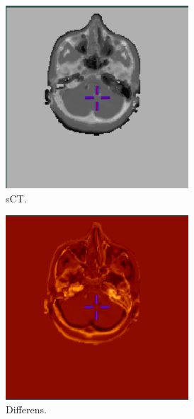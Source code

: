 \begin{figure}
\begin{subfigure}[b]{0.3\textwidth}
        \includegraphics[width=0.75\textwidth]{colager/loocv_ct/loocv_010960_sct.png}
        \caption{sCT.}
        \label{col:loocv_ct_pat4_sct}
    \end{subfigure}\hfill
    \begin{subfigure}[b]{0.3\textwidth}
        \centering
        \includegraphics[width=0.75\textwidth]{colager/loocv_ct/loocv_010960_sub.png}
        \caption{Differens.}
        \label{col:loocv_ct_pat4_sub}
    \end{subfigure}\\
    \begin{subfigure}[b]{0.3\textwidth}
        \centering

\end{subfigure}
\end{figure}
